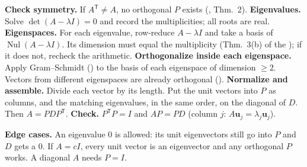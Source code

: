 \documentclass[10pt]{scrartcl}
\newcommand{\vv}[1]{\mathbf{#1}}
\DeclareMathOperator{\Nul}{Nul}
\newenvironment{howto}[1]{\begin{mdframed}[style=howtostyle,frametitle={#1}]}{\end{mdframed}}
\begin{document}
\begin{howto}{How to orthogonally diagonalize a symmetric matrix}
  \begin{steps}
    \ii \textbf{Check symmetry.} If $A^{\mathsf T}\neq A$, no orthogonal $P$ exists (, Thm.~2).
    \ii \textbf{Eigenvalues.} Solve $\det(A-\lambda I)=0$ and record the multiplicities; all roots are real.
    \ii \textbf{Eigenspaces.} For each eigenvalue, row-reduce $A-\lambda I$ and take a basis of $\Nul(A-\lambda I)$. Its dimension must equal the multiplicity (Thm.~3(b) of the ); if it does not, recheck the arithmetic.
    \ii \textbf{Orthogonalize inside each eigenspace.} Apply Gram--Schmidt () to the basis of each eigenspace of dimension $\ge 2$. Vectors from different eigenspaces are already orthogonal ().
    \ii \textbf{Normalize and assemble.} Divide each vector by its length. Put the unit vectors into $P$ as columns, and the matching eigenvalues, in the same order, on the diagonal of $D$. Then $A=PDP^{\mathsf T}$.
    \ii \textbf{Check.} $P^{\mathsf T}P=I$ and $AP=PD$ (column $j$: $A\vv u_j=\lambda_j\vv u_j$).
  \end{steps}
  \textbf{Edge cases.} An eigenvalue $0$ is allowed: its unit eigenvectors still go into $P$ and $D$ gets a $0$. If $A=cI$, every unit vector is an eigenvector and any orthogonal $P$ works. A diagonal $A$ needs $P=I$.
\end{howto}
\end{document}
